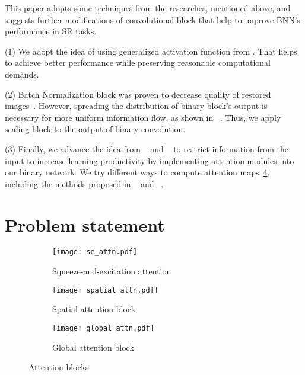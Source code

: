 \documentclass{article}
\begin{document}
This paper adopts some techniques from the researches, mentioned above, and suggests further modifications of convolutional block that help to improve BNN's performance in SR tasks. 

(1) We adopt the idea of using generalized activation function from \cite{liu2020reactnet}. That helps to achieve better performance while preserving reasonable computational demands. 

(2) Batch Normalization block was proven to decrease quality of restored images~\cite{lim2017enhanced}. However, spreading the distribution of binary block's output is necessary for more uniform information flow, as shown in ~\cite{xia2022basic}. Thus, we apply scaling block to the output of binary convolution.

(3) Finally, we advance the idea from ~\cite{xue2022ir2net} and ~\cite{guo2022join} to restrict information from the input to increase learning productivity by implementing attention modules into our binary network. We try different ways to compute attention maps~\ref{blocks}, including the methods proposed in ~\cite{zhao2020efficient} and ~\cite{hu2018squeeze}.

\section{Problem statement}
\label{sec:headings}

\begin{figure}[t]
\centering
  \begin{subfigure}[c]{0.35\textwidth}
    \texttt{[image: se\_attn.pdf]}
    \caption{Squeeze-and-excitation attention} \label{blocks:a}
  \end{subfigure}%
  \hspace*{\fill}   %
  \begin{subfigure}[c]{0.3\textwidth}
    \texttt{[image: spatial\_attn.pdf]}
    \caption{Spatial attention block} \label{blocks:b}
  \end{subfigure}%
  \hspace*{\fill}   %
  \begin{subfigure}[c]{0.31\textwidth}
    \texttt{[image: global\_attn.pdf]}
    \caption{Global attention block} \label{blocks:c}
  \end{subfigure}

\caption{Attention blocks} \label{blocks}
\end{figure}
\end{document}

